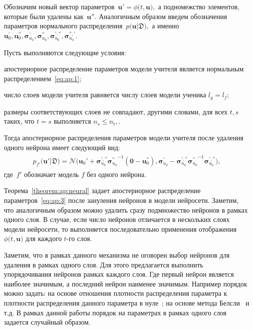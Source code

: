 \documentclass[12pt]{a&t}
\begin{document}
Обозначим новый вектор параметров~$\mathbf{u}' =  \phi\bigr(t, \mathbf{u}\bigr),$ а подномежство элементов, которые были удалены как~$\mathbf{u}''.$ Аналогичным образом введем обозначения параметров нормального распределения~$p\bigr(\mathbf{u}|\mathfrak{D}\bigr),$ а именно $\mathbf{u}_0^{'}, \mathbf{u}_0^{''}, \bm{\bm{\sigma}}_{u_0}^{'}, \bm{\bm{\sigma}}_{u_0}^{''}, \bm{\bm{\sigma}}_{u_0}^{', ''}, \bm{\bm{\sigma}}_{u_0}^{'','}.$

\begin{theorem}
\label{theorem:ap:neural}
Пусть выполняются следующие условия:
\begin{enumlist}
\item апостериорное распределение параметров модели учителя является нормальным распределением~\eqref{eq:ap:1};
\item число слоев модели учителя равняется числу слоев модели ученика ${l_g}={l_f}$;
\item размеры соответствующих слоев не совпадают, другими словами, для всех $t, s$ таких, что $t=s$ выполняется $n_s \leq n_t,$.
\end{enumlist}
Тогда апостериорное распределения параметров модели учителя после удаления одного нейрона имеет следующий вид:
\begin{gather}
\label{eq:ap:3}
\begin{aligned}
p_{f'}\bigr(\mathbf{u}'|\mathfrak{D}\bigr) = \mathcal{N}\bigr(\mathbf{u}_{0}'+\bm{\bm{\sigma}}_{u_0}^{', ''}{\bm{\bm{\sigma}}_{u_0}^{''}}^{-1}\left(\mathbf{0} - \mathbf{u}_0^{''}\right), \bm{\bm{\sigma}}_{u_0}^{'}-\bm{\bm{\sigma}}_{u_0}^{', ''}{\bm{\bm{\sigma}}_{u_0}^{''}}^{-1}\bm{\bm{\sigma}}_{u_0}^{', ''}\bigr),
\end{aligned}
\end{gather}
где~$f'$ обозначает модель $f$ без одного нейрона.
\end{theorem}

Теорема~\ref{theorem:ap:neural} задает апостериорное распределение параметров~\eqref{eq:ap:3} после зануления нейронов в модели нейросети. Заметим, что аналогичным образом можно удалить сразу подмножество нейронов в рамках одного слоя. В случае, если число нейронов отличается в нескольких слоях модели нейросети, то выполняется последовательно применения отображения~$\phi\bigr(t, \mathbf{u}\bigr)$ для каждого $t$-го слоя.

Заметим, что в рамках данного механизма не оговорен выбор нейронов для удаления в рамках одного слоя. Для этого предлагается выполнить упорядочивания нейронов рамках каждого слоя. Где первый нейрон является наиболее значимым, а последний нейрон наименее значимым. Например порядок можно задать: на основе отношения плотности распределения параметра к плотности распределения данного параметра в нуле~\cite{graves2011}; на основе метода Белсли~\cite{grabovoy2019} и т.д. В рамках данной работы порядок на параметрах в рамках одного слоя задается случайный образом.
\end{document}
